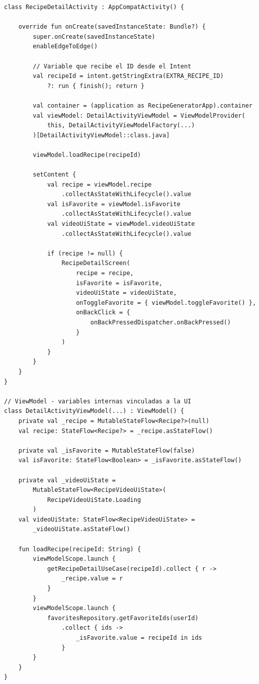\documentclass[stu, 12pt, letterpaper, donotrepeattitle, floatsintext, natbib]{apa7}
\begin{document}
\begin{lstlisting}[caption={Variables y vínculos en RecipeDetailActivity.kt}]
class RecipeDetailActivity : AppCompatActivity() {

    override fun onCreate(savedInstanceState: Bundle?) {
        super.onCreate(savedInstanceState)
        enableEdgeToEdge()

        // Variable que recibe el ID desde el Intent
        val recipeId = intent.getStringExtra(EXTRA_RECIPE_ID)
            ?: run { finish(); return }

        val container = (application as RecipeGeneratorApp).container
        val viewModel: DetailActivityViewModel = ViewModelProvider(
            this, DetailActivityViewModelFactory(...)
        )[DetailActivityViewModel::class.java]

        viewModel.loadRecipe(recipeId)

        setContent {
            val recipe = viewModel.recipe
                .collectAsStateWithLifecycle().value
            val isFavorite = viewModel.isFavorite
                .collectAsStateWithLifecycle().value
            val videoUiState = viewModel.videoUiState
                .collectAsStateWithLifecycle().value

            if (recipe != null) {
                RecipeDetailScreen(
                    recipe = recipe,
                    isFavorite = isFavorite,
                    videoUiState = videoUiState,
                    onToggleFavorite = { viewModel.toggleFavorite() },
                    onBackClick = {
                        onBackPressedDispatcher.onBackPressed()
                    }
                )
            }
        }
    }
}

// ViewModel - variables internas vinculadas a la UI
class DetailActivityViewModel(...) : ViewModel() {
    private val _recipe = MutableStateFlow<Recipe?>(null)
    val recipe: StateFlow<Recipe?> = _recipe.asStateFlow()

    private val _isFavorite = MutableStateFlow(false)
    val isFavorite: StateFlow<Boolean> = _isFavorite.asStateFlow()

    private val _videoUiState =
        MutableStateFlow<RecipeVideoUiState>(
            RecipeVideoUiState.Loading
        )
    val videoUiState: StateFlow<RecipeVideoUiState> =
        _videoUiState.asStateFlow()

    fun loadRecipe(recipeId: String) {
        viewModelScope.launch {
            getRecipeDetailUseCase(recipeId).collect { r ->
                _recipe.value = r
            }
        }
        viewModelScope.launch {
            favoritesRepository.getFavoriteIds(userId)
                .collect { ids ->
                    _isFavorite.value = recipeId in ids
                }
        }
    }
}
\end{lstlisting}
\end{document}
